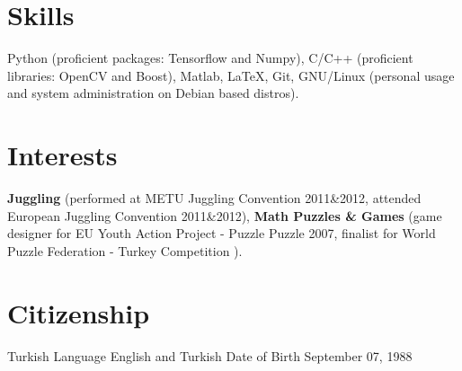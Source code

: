 \documentclass[margin,line,10pt]{resume}
\begin{document}
\begin{resume}
\section{\mysidestyle \textcolor{olgray}{Skills}}
Python (proficient packages: Tensorflow and Numpy), C/C++ (proficient libraries: OpenCV and Boost), Matlab, \LaTeX, Git, GNU/Linux (personal usage and system administration on Debian based distros).

\section{\mysidestyle \textcolor{olgray}{Interests}}
\textbf{Juggling} (performed at METU Juggling Convention 2011\&2012, attended European Juggling Convention 2011\&2012), \textbf{Math Puzzles \& Games} (game designer for EU Youth Action Project - Puzzle Puzzle 2007, finalist for World Puzzle Federation - Turkey Competition ).


\section{\mysidestyle \textcolor{olgray}{Citizenship}} Turkish \hspace{13.9mm} {\mysidestyle \textcolor{olgray}{Language}} \hspace{3.56mm} English and Turkish \hfill {\mysidestyle \textcolor{olgray}{Date of Birth}}  \hspace{3.56mm} September 07, 1988

\end{resume}
\end{document}
